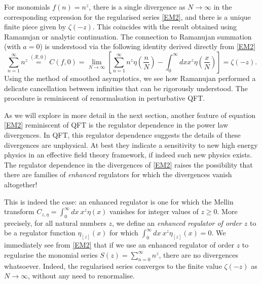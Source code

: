 \documentclass[12pt, letter]{article}
\def\be{\begin{equation}}
\def\ee{\end{equation}}
\newcommand{\Rcal}{\mathcal{R}}
\begin{document}
For monomials $f(n)=n^z$, there is a single divergence as $N\to \infty$ in the corresponding expression for the regularised series \eqref{EM2}, and there is a unique finite piece given by $\zeta(-z)$. This coincides with the result obtained using Ramanujan or analytic continuation.  The connection to Ramanujan summation (with $a=0$) is understood via the following identity derived directly from \eqref{EM2}
\be
\sum_{n=1}^\infty n^z\overset{(\Rcal, 0)}{=}C(f, 0)=\lim_{N \to \infty}\left[\sum_{n=1}^\infty n^z \eta\left(\frac{n}{N}\right)-\int_{0}^\infty dx  x^z \eta\left(\frac{x}{N}\right)\right]=\zeta(-z).
\ee
Using the method of smoothed asymptotics, we see how Ramanujan performed a delicate cancellation between infinities that can be rigorously understood. The procedure is reminiscent of renormalsation in perturbative QFT. 

As we will explore in more detail in the next section, another feature of equation \eqref{EM2} reminiscent of QFT is the regulator dependence in the power law divergences. In QFT, this regulator dependence suggests the details of these divergences are unphysical. At best they indicate a sensitivity to new high energy physics in an effective field theory framework, if indeed such new physics exists. The regulator dependence in the divergences of \eqref{EM2} raises the possibility that there are families of {\it enhanced} regulators for which the divergences vanish altogether!

This is indeed the case: an enhanced regulator is one for which the Mellin transform $C_{z, \eta} =\int_0^\infty dx \  x^z \eta(x)$  vanishes for integer values of $z \geq 0$. More precisely, for all natural numbers $z$, we define an {\it enhanced regulator of order $z$} to be a regulator function $\eta_{[z]}(x)$ for which 
$
\int_0^\infty dx \ x^z \eta_{[z]}(x)=0
$. We immediately see from \eqref{EM2} that if we use an enhanced regulator of order $z$ to  regularise the monomial series $S(z)=\sum_{n=0}^\infty n^z$,  there are no divergences whatsoever. Indeed, the regularised series converges to the finite  value $ \zeta(-z)$ as $N\to \infty$, without any need to renormalise.
\end{document}
